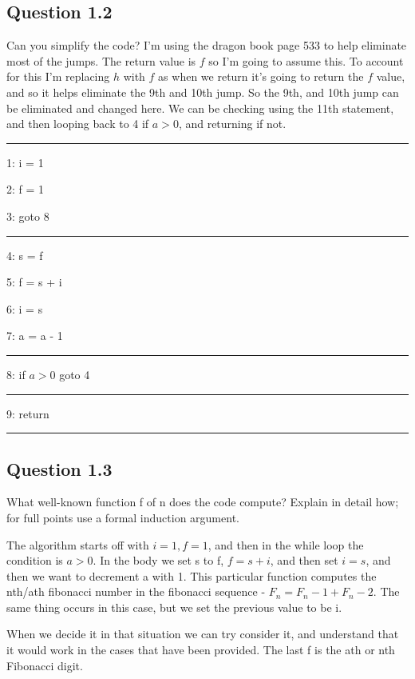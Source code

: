 \documentclass[11pt, oneside]{article}   	%
\begin{document}
\subsection{Question 1.2}
\par Can you simplify the code? I'm using the dragon book page 533 to help eliminate most of the jumps. The return value is $f$ so I'm going to assume this. To account for this I'm replacing $h$ with $f$ as when we return it's going to return the $f$ value, and so it helps eliminate the 9th and 10th jump. So the 9th, and 10th jump can be eliminated and changed here. We can be checking using the 11th statement, and then looping back to 4 if $a>0$, and returning if not.
\par \noindent\rule{8cm}{0.4pt}
\par 1: i = 1
\par 2: f = 1
\par 3: goto 8
\par \noindent\rule{8cm}{0.4pt}
\par 4: s = f
\par 5: f = s + i
\par 6: i = s
\par 7: a = a - 1
\par \noindent\rule{8cm}{0.4pt}
\par 8: if $a>0$ goto 4
\par \noindent\rule{8cm}{0.4pt}
\par 9: return
\par \noindent\rule{8cm}{0.4pt}

\subsection{Question 1.3}
\par What well-known function f of n does the code compute? Explain in detail how; for full points use a formal induction argument.
\par The algorithm starts off with $i = 1, f = 1$, and then in the while loop the condition is $a > 0$. In the body we set s to f, $f = s + i$, and then set $i = s$, and then we want to decrement a with 1. This particular function computes the nth/ath fibonacci number in the fibonacci sequence - $F_n = F_n-1 + F_n-2$. The same thing occurs in this case, but we set the previous value to be i.
\par When we decide it in that situation we can try consider it, and understand that it would work in the cases that have been provided. The last f is the ath or nth Fibonacci digit. 
\end{document}
